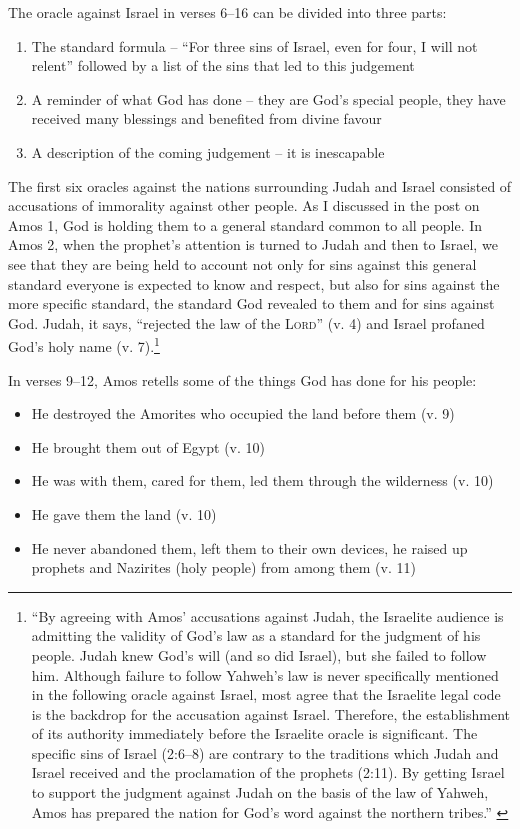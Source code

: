 The oracle against Israel in verses 6--16 can be divided into three parts:

\begin{enumerate}
    \item The standard formula -- \enquote{For three sins of Israel, even for
        four, I will not relent} followed by a list of the sins that led to this
        judgement
    \item A reminder of what God has done -- they are God's special people, they
        have received many blessings and benefited from divine favour
    \item A description of the coming judgement -- it is inescapable
\end{enumerate}

The first six oracles against the nations surrounding Judah and Israel consisted
of accusations of immorality against other people. As I discussed in the post on
Amos 1, God is holding them to a general standard common to all people. In Amos
2, when the prophet's attention is turned to Judah and then to Israel, we see
that they are being held to account not only for sins against this general
standard everyone is expected to know and respect, but also for sins against the
more specific standard, the standard God revealed to them and for sins against
God. Judah, it says, \enquote{rejected the law of the \textsc{Lord}} (v. 4) and
Israel profaned God's holy name (v. 7).\footnote{%
    \enquote{By agreeing with Amos' accusations against Judah, the Israelite
    audience is admitting the validity of God's law as a standard for the
    judgment of his people. Judah knew God's will (and so did Israel), but she
    failed to follow him. Although failure to follow Yahweh's law is never
    specifically mentioned in the following oracle against Israel, most agree
    that the Israelite legal code is the backdrop for the accusation against
    Israel. Therefore, the establishment of its authority immediately before the
    Israelite oracle is significant. The specific sins of Israel (2:6--8) are
    contrary to the traditions which Judah and Israel received and the
    proclamation of the prophets (2:11). By getting Israel to support the
    judgment against Judah on the basis of the law of Yahweh, Amos has prepared
    the nation for God's word against the northern tribes.}
    \autocite[116]{smith:2017}
}

In verses 9--12, Amos retells some of the things God has done for his people:

\begin{itemize}
    \item He destroyed the Amorites who occupied the land before them (v. 9)
    \item He brought them out of Egypt (v. 10)
    \item He was with them, cared for them, led them through the wilderness (v.
        10)
    \item He gave them the land (v. 10)
    \item He never abandoned them, left them to their own devices, he raised up
        prophets and Nazirites (holy people) from among them (v. 11)
\end{itemize}

